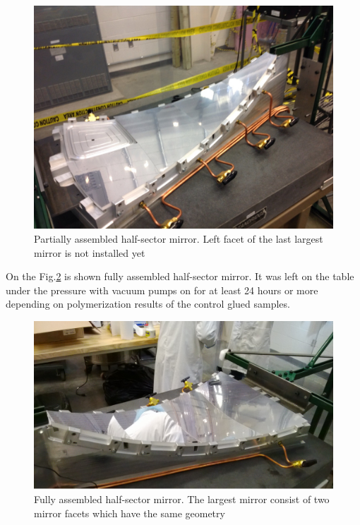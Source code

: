 \begin{figure}[ht]
    \centering
    \includegraphics[width=1.0\linewidth]{images/Partial_Half-sector.png}
    \caption{Partially assembled half-sector mirror. Left facet of the last largest mirror is not installed yet}
    \label{fig:Partial_Half-sector}
\end{figure} 
On the Fig.\ref{fig:Half-sector} is shown fully assembled half-sector mirror. It was left on the table under the pressure with vacuum pumps on for at least 24 hours or more depending on polymerization results of the control glued samples. 

\begin{figure}[ht]
    \centering
    \includegraphics[width=1.0\linewidth]{images/Half-sector.png}
    \caption{Fully assembled half-sector mirror. The largest mirror consist of two mirror facets which have the same geometry}
    \label{fig:Half-sector}
\end{figure}

